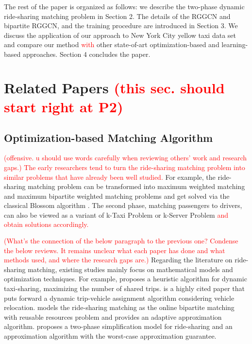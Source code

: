 \documentclass[sigconf]{acmart}
\newcommand{\tcr}[1]{{\textcolor{red}{#1}}}
\begin{document}
The rest of the paper is organized as follows: we describe the two-phase
dynamic ride-sharing matching problem in Section 2. The details of
the RGGCN and bipartite RGGCN, and the training procedure are introduced
in Section 3. We discuss the application of our approach to New York
City yellow taxi data set and compare our method \tcr{with} other state-of-art
optimization-based and learning-based approaches. Section 4 concludes
the paper.

\section{Related Papers \tcr{(this sec. should start right at P2)}}

\subsection{Optimization-based Matching Algorithm}

\tcr{(offensive. u should use words carefully when reviewing others' work and research gaps.) The early researchers tend to turn the ride-sharing matching problem
into similar problems that have already been well studied.} For example,
the ride-sharing matching problem can be transformed into maximum
weighted matching and maximum bipartite weighted matching problems
and get solved via the classical Blossom algorithm \cite{danassis2019putting}.
The second phase, matching passengers to drivers, can also be viewed
as a variant of k-Taxi Problem \cite{coester2019online} or k-Server
Problem \cite{koutsoupias1995k,koutsoupias2009k} 
\tcr{and obtain solutions
accordingly.} 

\tcr{(What's the connection of the below paragraph to the previous one? Condense the below reviews. It remains unclear what each paper has done and what methods used, and where the research gaps are.)}
Regarding the literature on ride-sharing matching, existing studies
mainly focus on mathematical models and optimization techniques. For
example, \cite{santos2013dynamic} proposes a heuristic algorithm
for dynamic taxi-sharing, maximizing the number of shared trips. \cite{alonso2017demand}
is a highly cited paper that puts forward a dynamic trip-vehicle assignment
algorithm considering vehicle relocation. \cite{dickerson2018allocation}
models the ride-sharing matching as the online bipartite matching
with reusable resources problem and provides an adaptive approximation
algorithm. \cite{bei2018algorithms} proposes a two-phase simplification
model for ride-sharing and an approximation algorithm with the worst-case
approximation guarantee. 
\end{document}
